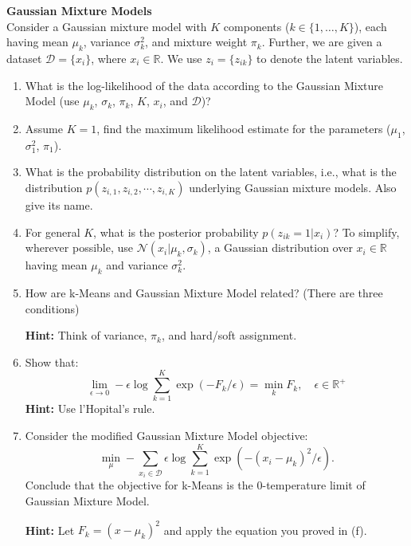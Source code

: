 \begin{Q}
\textbf{\Large Gaussian Mixture Models}\\

Consider a Gaussian mixture model with $K$ components ($k\in\{1, \ldots, K\}$), each having mean $\mu_k$, variance $\sigma_k^2$, and mixture weight $\pi_k$. Further, we are given a dataset $\mathcal{D} = \{x_i\}$, where $x_i \in \mathbb{R}$. We use $z_{i} = \{z_{ik}\}$ to denote the latent variables.


\begin{enumerate}

\item What is the log-likelihood of the data according to the Gaussian Mixture Model (use $\mu_k$, $\sigma_k$, $\pi_k$, $K$, $x_i$, and $\mathcal{D}$)?

\item Assume $K=1$,  find the maximum likelihood estimate for the parameters ($\mu_{1}$, $\sigma_{1}^{2}$, $\pi_{1}$).

\item What is the probability distribution on the latent variables, i.e., what is the distribution
$p(z_{i,1}, z_{i,2}, \cdots, z_{i,K} )$ underlying Gaussian mixture models. Also give its name.


\item For general $K$, what is the posterior probability $p(z_{ik} = 1|x_i)$? To simplify, wherever possible, use $\mathcal{N}(x_{i}|\mu_{k},\sigma_{k})$, a Gaussian distribution over $x_{i} \in \mathbb{R}$ having mean $\mu_{k}$ and variance $\sigma_{k}^2$.


\item  How are k-Means and Gaussian Mixture Model related? (There are three conditions)

\textbf{Hint:} Think of variance, $\pi_k$, and hard/soft assignment.

\item  Show that:
$$
\lim_{\epsilon \rightarrow 0} -\epsilon \log \sum_{k=1}^{K} \exp{(-F_{k}/\epsilon) } = \min_{k} F_{k}, \quad \epsilon \in \mathbb{R}^{+}
$$
\textbf{Hint:} Use l'Hopital's rule.

\item Consider the modified Gaussian Mixture Model objective:
$$
\min_{\mu} - \sum_{x_{i} \in \mathcal{D}} \epsilon \log \sum_{k=1}^{K} \exp{(-(x_{i} - \mu_{k} )^{2}/\epsilon) }.
$$
Conclude that the objective for k-Means is the 0-temperature limit of Gaussian Mixture Model.

\textbf{Hint:} Let $F_{k}= (x-\mu_{k})^{2}$ and apply the equation you proved in (f).



\end{enumerate}

\end{Q}
          
